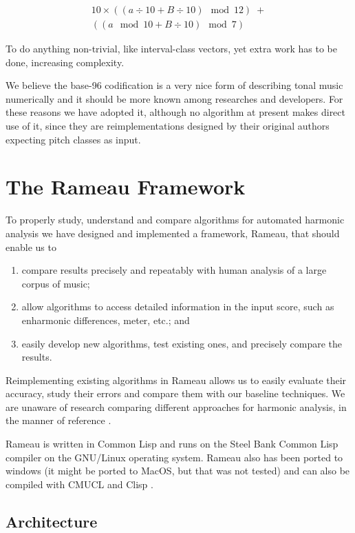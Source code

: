 \documentclass{article}
\begin{document}
\begin{eqnarray}
10\times((a \div 10 + B \div 10) \mod 12)\; + \nonumber \\
((a \mod 10 + B \div 10) \mod 7)
\end{eqnarray}

To do anything non-trivial, like interval-class vectors, yet extra
work has to be done, increasing complexity.

We believe the base-96 codification is a very nice form of describing
tonal music numerically and it should be more known among researches
and developers. For these reasons we have adopted it, although no
algorithm at present makes direct use of it, since they are
reimplementations designed by their original authors expecting pitch
classes as input. 

\section{The Rameau Framework}
\label{sec:system}

To properly study, understand and compare algorithms for automated
harmonic analysis we have designed and implemented a framework,
Rameau, that should enable us to

\begin{enumerate}
\item compare results precisely and repeatably with human analysis of
  a large corpus of music;
\item allow algorithms to access detailed information in the input score,
  such as enharmonic differences, meter, etc.; and
\item easily develop new algorithms, test existing ones, and precisely
  compare the results.
\end{enumerate}

Reimplementing existing algorithms in Rameau allows us to easily
evaluate their accuracy, study their errors and compare them with our
baseline techniques. We are unaware of research comparing different
approaches for harmonic analysis, in the manner of reference
\cite{gomez.ea:song}.

Rameau is written in Common Lisp and runs on the Steel Bank Common
Lisp \cite{team:sbcl} compiler on the GNU/Linux operating system.
Rameau also has been ported to windows (it might be ported to MacOS,
but that was not tested) and can also be compiled with CMUCL
\cite{maclachlan:cmucl} and Clisp \cite{haible.ea:clisp}.

\subsection{Architecture}
\label{sec:architecture-and-api}
\end{document}
